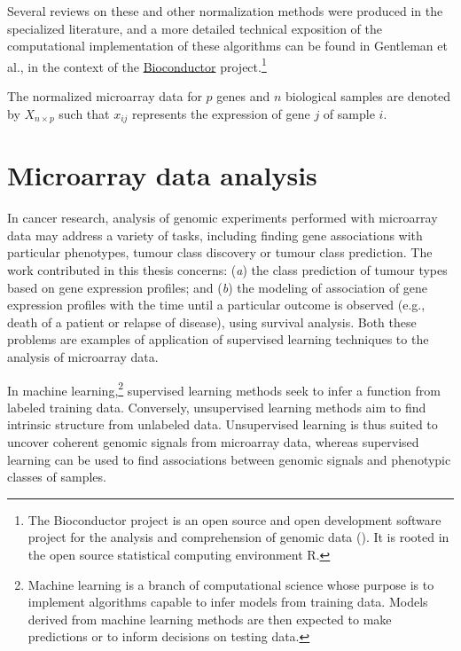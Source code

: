 Several reviews on these and other normalization methods were produced in the
specialized
literature,\cite{ploner_correlation_2005,bolstad_comparison_2003,harr_comparison_2006}
and a more detailed technical exposition of the computational implementation of
these algorithms can be found in Gentleman et
al.,\cite{gentleman_bioinformatics_2006} in the context of the
\href{http://www.bioconductor.org/}{\textsf{Bioconductor}} project.\footnote{The
  Bioconductor project is an open source and open development software project
  for the analysis and comprehension of genomic data
  (\citealp{gentleman_bioconductor:_2004}).  It is rooted in the open source
  statistical computing environment \textsf{R}.}

\medskip

The normalized microarray data for $p$ genes and $n$ biological samples are
denoted by $X_{n \times p}$ such that $x_{ij}$ represents the expression of gene
$j$ of sample $i$.

\section{Microarray data analysis}
\label{sec:microarray-methods-data-analysis}


In cancer research, analysis of genomic experiments performed with
 microarray data may address a variety of tasks, including
finding gene associations with particular phenotypes, tumour class discovery or
tumour class prediction.  The work contributed in this thesis concerns:
(\emph{a}) the class prediction of tumour types based on gene expression
profiles; and (\emph{b}) the modeling of association of gene expression profiles
with the time until a particular outcome is observed (e.g., death of a patient
or relapse of disease), using survival analysis.  Both these problems are
examples of application of supervised learning techniques to the analysis of
microarray data.

In machine learning,\footnote{Machine learning is a branch of computational
  science whose purpose is to implement algorithms capable to infer models from
  training data.  Models derived from machine learning methods are then expected
  to make predictions or to inform decisions on testing data.} supervised
learning methods seek to infer a function from labeled training data.
Conversely, unsupervised learning methods aim to find intrinsic structure from
unlabeled data.\cite{webb_statistical_2003} Unsupervised learning is thus suited
to uncover coherent genomic signals from microarray data, whereas supervised
learning can be used to find associations between genomic signals and phenotypic
classes of samples.

